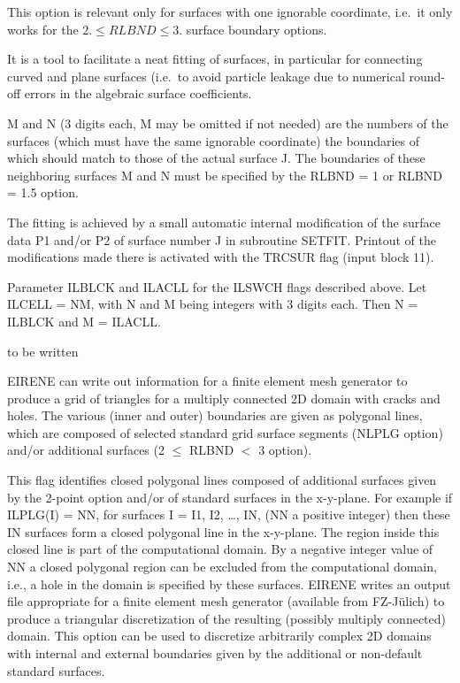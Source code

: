 \begin{description}
        This option is relevant only for surfaces with one ignorable coordinate, i.e.\
        it only works for the $2.
          \le RLBND \le 3$. surface boundary options.

        It is a tool to facilitate a neat fitting of surfaces, in particular for
        connecting curved and plane surfaces (i.e.\ to avoid particle leakage due to
        numerical round-off errors in the algebraic surface coefficients.

        M and N (3 digits each, M may be omitted if not needed) are the numbers of the
        surfaces (which must have the same ignorable coordinate) the boundaries of
        which should match to those of the actual surface J.
        The boundaries of these neighboring surfaces M and N must be specified by the
        RLBND = 1 or RLBND = 1.5 option.

        The fitting is achieved by a small automatic internal modification of the
        surface data P1 and/or P2 of surface number J in subroutine SETFIT.
        Printout of the modifications made there is activated with the TRCSUR flag
        (input block 11).
  \item[ILCELL] Parameter ILBLCK and ILACLL for the ILSWCH flags described above.
        Let ILCELL = NM, with N and M being integers with 3 digits each.
        Then N = ILBLCK and M = ILACLL.

  \item[ILBOX] to be written
  \item[ILPLG] EIRENE can write out information for a
        finite element mesh generator to produce a grid of triangles for a multiply
        connected 2D domain with cracks and holes.
        The various (inner and outer) boundaries are given as polygonal lines, which
        are composed of selected standard grid surface segments (NLPLG option) and/or
        additional surfaces (2 $\le$ RLBND $<$ 3 option).

        This flag identifies closed polygonal lines composed of additional surfaces
        given by the 2-point option and/or of standard surfaces in the x-y-plane.
        For example if ILPLG(I) = NN, for surfaces I = I1, I2, \dots, IN, (NN a
        positive integer) then these IN surfaces form a closed polygonal line in the
        x-y-plane.
        The region inside this closed line is part of the computational domain.
        By a negative integer value of NN a closed polygonal region can be excluded
        from the computational domain, i.e., a hole in the domain is specified by these
        surfaces.
        EIRENE writes an output file appropriate for a finite element mesh generator
        (available from FZ-J\"ulich) to produce a triangular discretization of the
        resulting (possibly multiply connected) domain.
        This option can be used to discretize arbitrarily complex 2D domains with
        internal and external boundaries given by the additional or non-default
        standard surfaces.


\end{description}
